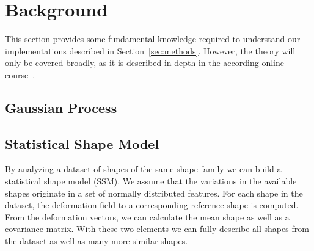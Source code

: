 \section{Background}
\label{sec:background}

This section provides some fundamental knowledge required to understand our implementations described in Section~\ref{sec:methods}.
However, the theory will only be covered broadly, as it is described in-depth in the according online course~\citep{mooc2019statistical}.


\subsection{Gaussian Process}
\label{subsec:gp}



\subsection{Statistical Shape Model}
\label{subsec:ssm}

By analyzing a dataset of shapes of the same shape family we can build a statistical shape model (SSM).
We assume that the variations in the available shapes originate in a set of normally distributed features.
For each shape in the dataset, the deformation field to a corresponding reference shape is computed.
From the deformation vectors, we can calculate the mean shape as well as a covariance matrix.
With these two elements  we can fully describe all shapes from the dataset as well as many more similar shapes.



